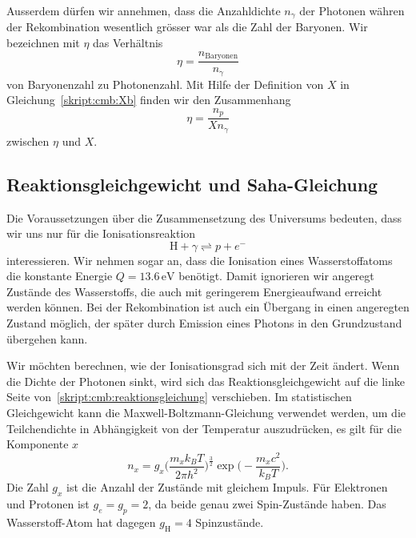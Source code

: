 Ausserdem dürfen wir annehmen, dass die Anzahldichte $n_\gamma$
der Photonen währen der Rekombination wesentlich grösser war als
die Zahl der Baryonen.
Wir bezeichnen mit $\eta$ das Verhältnis
\[
\eta = \frac{n_\text{Baryonen}}{n_\gamma}
\]
von Baryonenzahl zu Photonenzahl.
Mit Hilfe der Definition von $X$ in Gleichung~\eqref{skript:cmb:Xb}
finden wir den Zusammenhang
\begin{equation}
\eta = \frac{n_p}{Xn_\gamma}
\label{skript:cmb:etaX}
\end{equation}
zwischen $\eta$ und $X$.

\subsection{Reaktionsgleichgewicht und Saha-Gleichung}
Die Voraussetzungen über die Zusammensetzung des Universums bedeuten,
dass wir uns nur für die Ionisationsreaktion
\begin{equation}
\text{H} + \gamma 
\rightleftharpoons
p + e^-
\label{skript:cmb:reaktionsgleichung}
\end{equation}
interessieren.
Wir nehmen sogar an, dass die Ionisation eines Wasserstoffatoms 
die konstante Energie $Q=13.6\,\text{eV}$ benötigt.
Damit ignorieren wir angeregt Zustände des Wasserstoffs, die auch
mit geringerem Energieaufwand erreicht werden können.
Bei der Rekombination ist auch ein Übergang in einen angeregten
Zustand möglich, der später durch Emission eines Photons in den Grundzustand
übergehen kann.

Wir möchten berechnen, wie der Ionisationsgrad sich mit der Zeit ändert.
Wenn die Dichte der Photonen sinkt, wird sich das Reaktionsgleichgewicht
auf die linke Seite von~\eqref{skript:cmb:reaktionsgleichung} verschieben.
Im statistischen Gleichgewicht kann die Maxwell-Boltzmann-Gleichung
verwendet werden, um die Teilchendichte in Abhängigkeit von der Temperatur
auszudrücken, es gilt für die Komponente $x$
\[
n_x
=
g_x \biggl(\frac{m_xk_BT}{2\pi h^2}\biggr)^{\frac32}
\exp\biggl(-\frac{m_xc^2}{k_BT}\biggr).
\]
Die Zahl $g_x$ ist die Anzahl der Zustände mit gleichem Impuls.
Für Elektronen und Protonen ist $g_e=g_p=2$, da beide genau zwei
Spin-Zustände haben.
Das Wasserstoff-Atom hat dagegen $g_\text{H}=4$ Spinzustände.


